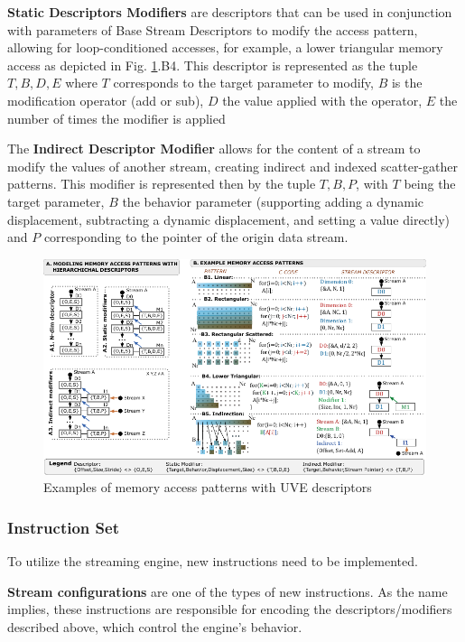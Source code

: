 \textbf{Static Descriptors Modifiers} are descriptors that can be used in conjunction with parameters of Base Stream Descriptors to modify the access pattern, allowing for loop-conditioned accesses, for example, a lower triangular memory access as depicted in Fig. \ref{fig:stream-descriptors}.B4. This descriptor is represented as the tuple ${T, B, D, E}$ where $T$ corresponds to the target parameter to modify, $B$ is the modification operator (add or sub), $D$ the value applied with the operator, $E$ the number of times the modifier is applied 

The \textbf{Indirect Descriptor Modifier} allows for the content of a stream to modify the values of another stream, creating indirect and indexed scatter-gather patterns. This modifier is represented then by the tuple ${T, B, P}$, with $T$ being the target parameter, $B$ the behavior parameter (supporting adding a dynamic displacement, subtracting a dynamic displacement, and setting a value directly) and $P$ corresponding to the pointer of the origin data stream.

\begin{figure}[H]
	\begin{center}
 		\includegraphics[width=\linewidth]{images/UVE-Descriptors.pdf}
 		\caption{Examples of memory access patterns with UVE descriptors }
 		\label{fig:stream-descriptors}
	\end{center} 
\end{figure}

\subsubsection{Instruction Set}
To utilize the streaming engine, new instructions need to be implemented.

\textbf{Stream configurations} are one of the types of new instructions. As the name implies, these instructions are responsible for encoding the descriptors/modifiers described above, which control the engine's behavior. 

